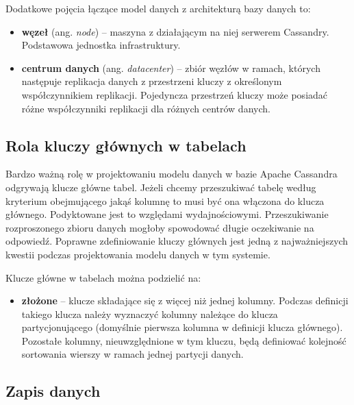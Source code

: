 Dodatkowe pojęcia łączące model danych z architekturą bazy danych to:
\begin{itemize}
    \item \textbf{węzeł} (ang. \textit{node}) -- maszyna z działającym na niej serwerem Cassandry.
    Podstawowa jednostka infrastruktury.
    \item \textbf{centrum danych} (ang. \textit{datacenter}) -- zbiór węzłów w ramach, których następuje replikacja danych z przestrzeni kluczy z określonym współczynnikiem replikacji.
    Pojedyncza przestrzeń kluczy może posiadać różne współczynniki replikacji dla różnych centrów danych.
\end{itemize}

\subsection{Rola kluczy głównych w tabelach}

Bardzo ważną rolę w projektowaniu modelu danych w bazie Apache Cassandra odgrywają klucze główne tabel.
Jeżeli chcemy przeszukiwać tabelę według kryterium obejmującego jakąś kolumnę to musi być ona włączona do klucza głównego.
Podyktowane jest to względami wydajnościowymi.
Przeszukiwanie rozproszonego zbioru danych mogłoby spowodować długie oczekiwanie na odpowiedź.
Poprawne zdefiniowanie kluczy głównych jest jedną z najważniejszych kwestii podczas projektowania modelu danych w tym systemie.

Klucze główne w tabelach można podzielić na:
\begin{itemize}

    \item \textbf{złożone} -- klucze składające się z więcej niż jednej kolumny. 
    Podczas definicji takiego klucza należy wyznaczyć kolumny należące do klucza partycjonującego (domyślnie pierwsza kolumna w definicji klucza głównego).
    Pozostałe kolumny, nieuwzględnione w tym kluczu, będą definiować kolejność sortowania wierszy w ramach jednej partycji danych.
\end{itemize}

\subsection{Zapis danych}

